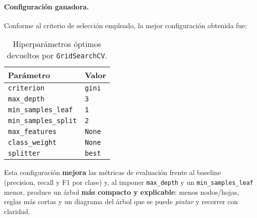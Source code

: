 \paragraph{Configuración ganadora.}
Conforme al criterio de selección empleado, la mejor configuración obtenida fue:

\begin{table}[h]
\centering
\label{tab:best-params}
\small
\begin{tabular}{@{}ll@{}}
\toprule
\textbf{Parámetro}              & \textbf{Valor} \\ \midrule
\texttt{criterion}              & \texttt{gini} \\
\texttt{max\_depth}             & \texttt{3} \\
\texttt{min\_samples\_leaf}     & \texttt{1} \\
\texttt{min\_samples\_split}    & \texttt{2} \\
\texttt{max\_features}          & \texttt{None} \\
\texttt{class\_weight}          & \texttt{None} \\
\texttt{splitter}               & \texttt{best} \\ \bottomrule
\end{tabular}
\caption{Hiperparámetros óptimos devueltos por \texttt{GridSearchCV}.}
\end{table}

Esta configuración \textbf{mejora} las métricas de evaluación frente al baseline (precision, recall y F1 por clase) y, al imponer \texttt{max\_depth} y un \texttt{min\_samples\_leaf} menor, produce un árbol \textbf{más compacto y explicable}: menos nodos/hojas, reglas más cortas y un diagrama del árbol que se puede \emph{pintar} y recorrer con claridad.

